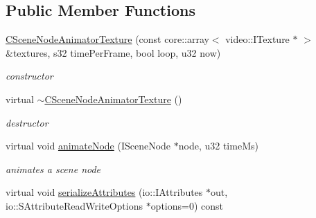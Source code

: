 \subsection*{Public Member Functions}
\begin{DoxyCompactItemize}
\item 
\hypertarget{classirr_1_1scene_1_1_c_scene_node_animator_texture_a3851b09eb4ad1e32a13e9b0de1e64fcf}{\hyperlink{classirr_1_1scene_1_1_c_scene_node_animator_texture_a3851b09eb4ad1e32a13e9b0de1e64fcf}{C\-Scene\-Node\-Animator\-Texture} (const core\-::array$<$ video\-::\-I\-Texture $\ast$ $>$ \&textures, s32 time\-Per\-Frame, bool loop, u32 now)}\label{classirr_1_1scene_1_1_c_scene_node_animator_texture_a3851b09eb4ad1e32a13e9b0de1e64fcf}

\begin{DoxyCompactList}\small\item\em constructor \end{DoxyCompactList}\item 
\hypertarget{classirr_1_1scene_1_1_c_scene_node_animator_texture_a8bde4f76eb299a5efc6d95b166533004}{virtual \hyperlink{classirr_1_1scene_1_1_c_scene_node_animator_texture_a8bde4f76eb299a5efc6d95b166533004}{$\sim$\-C\-Scene\-Node\-Animator\-Texture} ()}\label{classirr_1_1scene_1_1_c_scene_node_animator_texture_a8bde4f76eb299a5efc6d95b166533004}

\begin{DoxyCompactList}\small\item\em destructor \end{DoxyCompactList}\item 
\hypertarget{classirr_1_1scene_1_1_c_scene_node_animator_texture_a841dccc2c146dd7ec767026cd529e57a}{virtual void \hyperlink{classirr_1_1scene_1_1_c_scene_node_animator_texture_a841dccc2c146dd7ec767026cd529e57a}{animate\-Node} (I\-Scene\-Node $\ast$node, u32 time\-Ms)}\label{classirr_1_1scene_1_1_c_scene_node_animator_texture_a841dccc2c146dd7ec767026cd529e57a}

\begin{DoxyCompactList}\small\item\em animates a scene node \end{DoxyCompactList}\item 
\hypertarget{classirr_1_1scene_1_1_c_scene_node_animator_texture_ac9f6adaac4b732f8230b4dab6bc7fac1}{virtual void \hyperlink{classirr_1_1scene_1_1_c_scene_node_animator_texture_ac9f6adaac4b732f8230b4dab6bc7fac1}{serialize\-Attributes} (io\-::\-I\-Attributes $\ast$out, io\-::\-S\-Attribute\-Read\-Write\-Options $\ast$options=0) const }\label{classirr_1_1scene_1_1_c_scene_node_animator_texture_ac9f6adaac4b732f8230b4dab6bc7fac1}


\end{DoxyCompactItemize}
